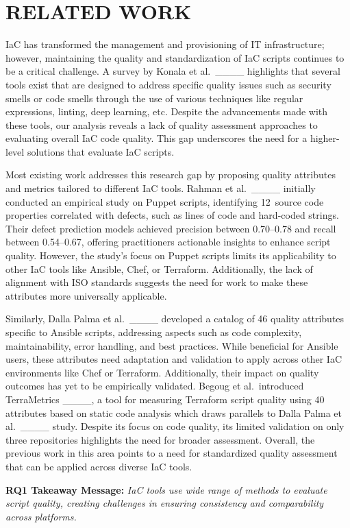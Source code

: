 \section{RELATED WORK}
IaC has transformed the management and provisioning of IT infrastructure; however, maintaining the quality and standardization of IaC scripts continues to be a critical challenge. A survey by Konala et al.\ ____ highlights that several tools exist that are designed to address specific quality issues such as security smells or code smells through the use of various techniques like regular expressions, linting, deep learning, etc. Despite the advancements made with these tools, our analysis reveals a lack of  quality assessment approaches to evaluating overall IaC code quality. This gap underscores the need for a higher-level solutions that evaluate IaC scripts.

Most existing work addresses this research gap by 
proposing quality attributes and metrics tailored to different IaC tools. Rahman et al.\ ____ initially conducted an empirical study on Puppet scripts, identifying 12~source code properties correlated with defects, such as lines of code and hard-coded strings. Their defect prediction models achieved precision between 0.70--0.78 and recall between 0.54--0.67, offering practitioners actionable insights to enhance script quality. However, the study’s focus on Puppet scripts limits its applicability to other IaC tools like Ansible, Chef, or Terraform. Additionally, the lack of alignment with ISO standards suggests the need for work to make these attributes more universally applicable.

Similarly, Dalla Palma et al.\ ____ developed a catalog of 46 quality attributes specific to Ansible scripts, addressing aspects such as code complexity, maintainability, error handling, and best practices. While beneficial for Ansible users, these attributes need adaptation and validation to apply across other IaC environments like Chef or Terraform. Additionally, their impact on quality outcomes has yet to be empirically validated. Begoug et al.\ introduced TerraMetrics ____, a tool for measuring Terraform script quality using 40 attributes based on static code analysis which draws parallels to Dalla Palma et al.\ ____ study. Despite its focus on code quality, its limited validation on only three repositories highlights the need for broader assessment. Overall, the previous work in this area points to a need for standardized quality assessment that can be applied across diverse IaC tools.

\begin{tcolorbox}[
    colframe=SlateGray4, 
    colback=Snow1!20,  
    boxrule=1pt, 
    rounded corners
]
 \textbf{RQ1 Takeaway Message:} \textit{IaC tools use wide range of methods to evaluate script quality, creating challenges in ensuring consistency and comparability across platforms.}
\end{tcolorbox}